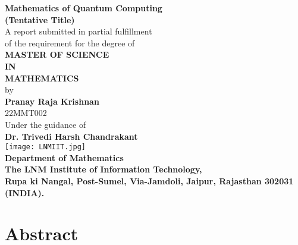 \documentclass[12pt,twoside]{report}
\theoremstyle{thmstyle}
\begin{document}
\begin{titlepage}
    \begin{center}
        \vspace*{0.25cm}
        \Huge{\textbf{\large Mathematics of Quantum Computing \\(Tentative Title)}}\\
        \vspace{0.50cm}
        \small
        A report submitted in partial fulfillment\\
        of the requirement for the  degree of  \\
        \vspace{0.25cm}
        \textbf{MASTER OF SCIENCE \\ IN \\ MATHEMATICS}\\
        \vspace{1.00cm}
        by\\ \vspace{0.25cm}
        \large
        \textbf{Pranay Raja Krishnan}\\
        \vspace{0.15cm}
        \large{22MMT002}\\
        \vspace{0.25cm}
        Under the guidance of\\
        \vspace{0.25cm}
        \textbf{Dr. Trivedi Harsh Chandrakant}\\

        \vspace{1cm}
        \texttt{[image: LNMIIT.jpg]}\\
        \vspace{1.50cm}
        \large
        \textbf{Department of Mathematics\\
        The LNM Institute of Information Technology,\\ Rupa ki Nangal, Post-Sumel, Via-Jamdoli, Jaipur, Rajasthan 302031 (INDIA).}\\%
    \end{center}
\end{titlepage}

\newpage

\chapter*{Abstract}
\lipsum[1]
\end{document}

